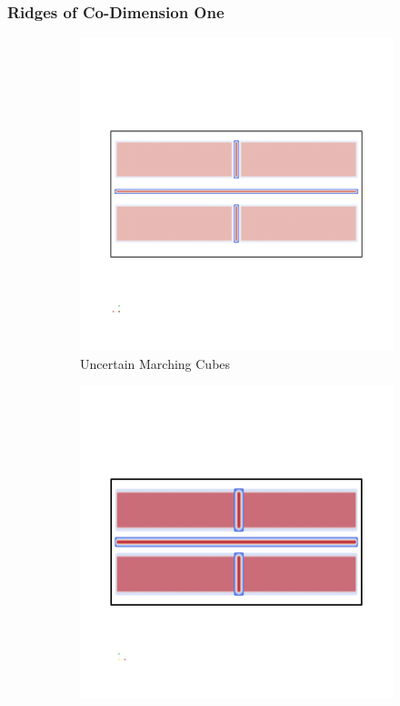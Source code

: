 \subsubsection{Ridges of Co-Dimension One}\label{sec:evalMeth}

\begin{figure}
    \begin{subfigure}{0.49\textwidth}
        \includegraphics[trim=0 450 0 450, clip=true, width=\textwidth]{Images/oldSide.png}
        \caption{Uncertain Marching Cubes}
        \label{fig:UMCside}
    \end{subfigure}
    \begin{subfigure}{0.49\textwidth}
        \includegraphics[trim=0 450 0 450, clip=true, width=\textwidth]{Images/newSide.png}

\end{subfigure}
\end{figure}
